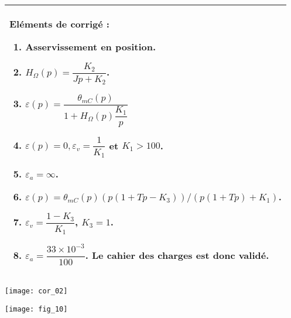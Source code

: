 \begin{multicols}{2}
\ifcolle
\else
\ifprof
\else
\footnotesize
\begin{tabular}{|p{\linewidth}|}
\hline
Eléments de corrigé :
\begin{enumerate}
\item Asservissement en position.
\item $H_{\Omega}(p)= \dfrac{K_2}{Jp+K_2}$.%
\item $\varepsilon(p)=\dfrac{ \theta_{mC}(p)}{1+H_{\Omega}(p) \dfrac{K_1}{p}}$
\item $\varepsilon(p)= 0, \varepsilon_v = \dfrac{1}{K_1}$   et $K_1 >100$.
\item $\varepsilon_a = \infty$.
\item $\varepsilon(p) = \theta_{mC}(p)\left(p\left( 1+Tp-K_3\right) \right)/\left(p \left( 1+Tp\right)+K_1\right) $.
\item $\varepsilon_v =\dfrac{1-K_3}{K_1}$, $K_3=1$.
\item $\varepsilon_a = \dfrac{33\times 10^{-3}}{100} $. Le cahier des charges est donc validé. 
\end{enumerate} \\
\hline
\end{tabular}
\normalsize
\fi
\fi
\ifprof
\else
\end{multicols}
\fi
\ifprof
\begin{center}
\texttt{[image: cor\_02]}
\end{center}

\else
\begin{center}
\texttt{[image: fig\_10]}
\end{center}
\fi
